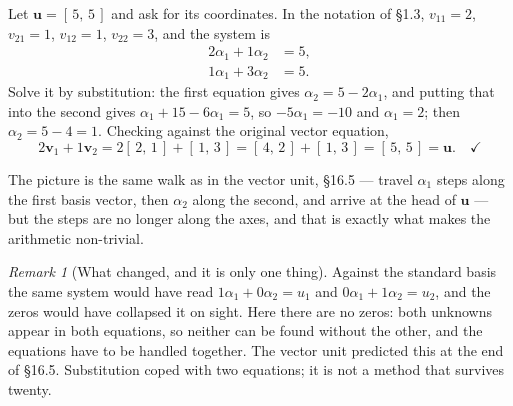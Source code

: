 \documentclass[11pt]{article}
\theoremstyle{plain}
\theoremstyle{definition}
\theoremstyle{remark}
\newtheorem*{rmk}{Remark}
\newcommand{\vc}[1]{\mathbf{#1}}        %
\newcommand{\lattice}[4]{%
  \draw[step=1cm,gray!25,very thin] (#1,#3) grid (#2,#4);
  \draw[axisline] (#1,0) -- (#2+0.45,0) node[right,font=\scriptsize,black]{$x$};
  \draw[axisline] (0,#3) -- (0,#4+0.45) node[above,font=\scriptsize,black]{$y$};
}
\begin{document}
Let $\vc{u}=[\,5,\,5\,]$ and ask for its coordinates. In the notation of \S1.3,
$v_{11}=2$, $v_{21}=1$, $v_{12}=1$, $v_{22}=3$, and the system is
\[
  \begin{aligned}
    2\alpha_1 + 1\alpha_2 &= 5 ,\\
    1\alpha_1 + 3\alpha_2 &= 5 .
  \end{aligned}
\]
Solve it by substitution: the first equation gives $\alpha_2=5-2\alpha_1$, and
putting that into the second gives $\alpha_1+15-6\alpha_1=5$, so
$-5\alpha_1=-10$ and $\alpha_1=2$; then $\alpha_2=5-4=1$. Checking against the
original vector equation,
\[
  2\vc{v}_1 + 1\vc{v}_2 = 2[\,2,\,1\,] + [\,1,\,3\,]
  = [\,4,\,2\,] + [\,1,\,3\,] = [\,5,\,5\,] = \vc{u} . \quad\checkmark
\]

\begin{center}
\end{center}

\noindent The picture is the same walk as in the vector unit, \S16.5 --- travel
$\alpha_1$ steps along the first basis vector, then $\alpha_2$ along the second,
and arrive at the head of $\vc{u}$ --- but the steps are no longer along the
axes, and that is exactly what makes the arithmetic non-trivial.

\begin{rmk}[What changed, and it is only one thing]
Against the standard basis the same system would have read
$1\alpha_1+0\alpha_2=u_1$ and $0\alpha_1+1\alpha_2=u_2$, and the zeros would
have collapsed it on sight. Here there are no zeros: both unknowns appear in
both equations, so neither can be found without the other, and the equations
have to be handled together. The vector unit predicted this at the end of
\S16.5. Substitution coped with two equations; it is not a method that survives
twenty.
\end{rmk}
\end{document}

